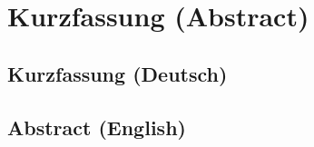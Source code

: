 \section*{Kurzfassung (Abstract)}

\subsection*{Kurzfassung (Deutsch)}
\lipsum[1]

\subsection*{Abstract (English)}
\lipsum[1]